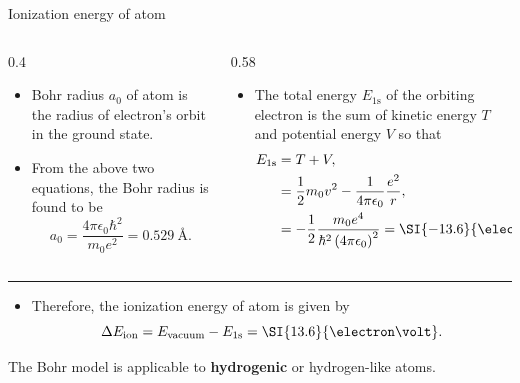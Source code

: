 \begin{frame}{Ionization energy of  atom}
	\vspace{-1em}
	\begin{columns}
		\begin{column}[t]{0.4\textwidth}
\begin{small}
					\begin{itemize}
			\item Bohr radius \(a_0\) of  atom is the radius of electron's orbit in the ground state.
			\item From the above two equations, the Bohr radius is found to be
			\begin{equation}
				a_0 = \frac{4 \pi \epsilon_0 \hbar^2}{m_0e^2} = \SI{0.529}{\angstrom}.
			\end{equation}
		\end{itemize}
\end{small}
		\end{column}
		\begin{column}[t]{0.58\textwidth}
\begin{small}
				\begin{itemize}
				\item The total energy \(E_\text{1s}\) of the orbiting  electron is the sum of kinetic energy \(T\) and potential energy \(V\) so that
				\begin{align*}
					E_\text{1s} &= T + V, \\
				 &= \frac{1}{2} m_0 v^2 - \frac{1}{4 \pi \epsilon_0} \frac{e^2}{r}, \\
					&= - \frac{1}{2} \frac{m_0e^4}{\hbar^2 \left(4 \pi \epsilon_0\right)^2} = \SI{-13.6}{\electron\volt} \tag{2}
				\end{align*}
			\end{itemize}
\end{small}
		\end{column}
	\end{columns}
	\hrule
\begin{small}
		\begin{itemize}
		\item Therefore, the ionization energy of  atom is given by
		\[
		\Delta E_\text{ion} = E_\text{vacuum} - E_\text{1s} = \SI{13.6}{\electron\volt}.
		\]
	\end{itemize}
\end{small}
	\begin{keyinsight}
		The Bohr model is applicable to \textbf{hydrogenic} or hydrogen-like atoms.
	\end{keyinsight}
\end{frame}
